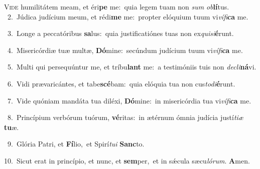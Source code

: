 \lettrine{\initial\textcolor{\initialcolor}{V}}{ide} humilitátem meam, et éri\textbf{pe} me:~\star quia legem tuam non \textit{sum} \textit{ob}\-\textbf{lí}tus.\\
{\numbfont\textcolor{\numbcolor}{~2.}}~Júdica judícium meum, et rédi\textbf{me} me:~\star propter elóquium tuum vi\-\textit{ví}\-\textit{fi}\textbf{ca} me.\par
{\numbfont\textcolor{\numbcolor}{~3.}}~Longe a peccatóribus \textbf{sa}\-lus:~\star quia justificatiónes tuas non ex\-\textit{qui}\-\textit{si}\textbf{é}runt.\par
{\numbfont\textcolor{\numbcolor}{~4.}}~Misericórdiæ tuæ multæ, \textbf{Dó}\-mine:~\star secúndum judícium tuum vi\-\textit{ví}\-\textit{fi}\textbf{ca} me.\par
{\numbfont\textcolor{\numbcolor}{~5.}}~Multi qui persequúntur me, et tríbu\textbf{lant} me:~\star a testimóniis tuis non \textit{de}\-\textit{cli}\textbf{ná}vi.\par
{\numbfont\textcolor{\numbcolor}{~6.}}~Vidi prævaricántes, et tabe\-\textbf{scé}\-bam:~\star quia elóquia tua non cus\-\textit{to}\-\textit{di}\textbf{é}runt.\par
{\numbfont\textcolor{\numbcolor}{~7.}}~Vide quóniam mandáta tua diléxi, \textbf{Dó}\-mine:~\star in misericórdia tua vi\-\textit{ví}\-\textit{fi}\textbf{ca} me.\par
{\numbfont\textcolor{\numbcolor}{~8.}}~Princípium verbórum tuórum, \textbf{vé}\-ritas:~\star in ætérnum ómnia judícia justí\-\textit{ti}\-\textit{æ} \textbf{tu}\-æ.\par
{\numbfont\textcolor{\numbcolor}{~9.}}~Glória Patri, et \textbf{Fí}\-lio,~\star et Spirí\-\textit{tu}\-\textit{i} \textbf{Sanc}\-to.\par
{\numbfont\textcolor{\numbcolor}{10.}}~Sicut erat in princípio, et nunc, et \textbf{sem}\-per,~\star et in sǽcula sæcu\-\textit{ló}\-\textit{rum}. \textbf{A}\-men.\par
